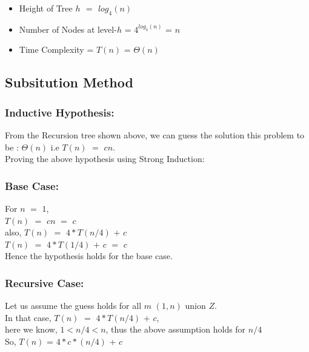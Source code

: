 \documentclass{article}
\begin{document}
   \begin{itemize}
    \item Height of Tree \textbf{$h$ $=$ $log_{4}(n)$}
    \item Number of Nodes at level-$h$ = $4^{log_{4}(n)}$ = $n$
    \item Time Complexity = $T(n)$ = $\Theta(n)$
   \end{itemize}

   \newpage
   \subsection{Subsitution Method}
   \subsubsection{Inductive Hypothesis:} 
   From the Recursion tree shown above, we can guess the solution this problem to be :
   $\Theta(n)$
   i.e $T(n)$ $=$ $cn$.
\\

Proving the above hypothesis using Strong Induction:
 \subsubsection{Base Case:}
 For $n$ $=$ $1$,\\
 
 $T(n)$ $=$ $cn$ $=$ $c$\\
 
 also, $T(n)$ $=$ $4*T(n/4)$ $+$ $c$\\
            
 $T(n)$ $=$ $4*T(1/4)$ $+$ $c$ $=$ $c$\\
            
 Hence the hypothesis holds for the base case.
 
 \subsubsection{Recursive Case:}
 Let us assume the guess holds for all $m$ $(1,n)$ union $Z$.\\

 In that case, $T(n)$ $=$ $4*T(n/4)$ $+$ $c$,\\
 
 here we know, $1 < n/4 < n$, thus the above assumption holds for $n/4$\\

So, $T(n)$ = $4*c*(n/4)$ + $c$\\
\end{document}
